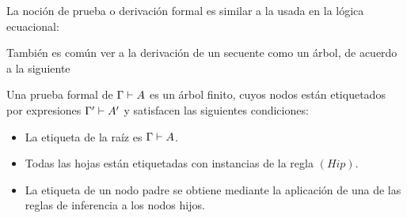 \documentclass[11pt,letterpaper]{article}
\begin{document}

\bigskip

La noción de prueba o derivación formal es similar a la usada en la lógica ecuacional:


 
\noindent También es común ver a la derivaci\'on de un secuente como un
\'arbol, de acuerdo a la siguiente

\begin{definition}
  Una prueba formal de $\Gamma\vdash A$ es un árbol finito, cuyos nodos están
  etiquetados por expresiones $\Gamma'\vdash A'$ y satisfacen las siguientes
  condiciones:
  \begin{itemize}
  \item La etiqueta de la raíz es $\Gamma\vdash A$.
  \item Todas las hojas están etiquetadas con instancias de la regla $(Hip)$.
  \item La etiqueta de un nodo padre se obtiene mediante la aplicación de una
  de las reglas de inferencia a los nodos hijos.
  \end{itemize}
\end{definition}
\end{document}
